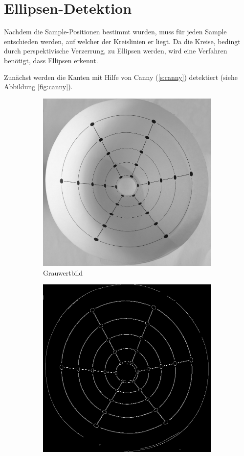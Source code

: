 \section{Ellipsen-Detektion}
\label{s:ellipseDetection}
Nachdem die Sample-Positionen bestimmt wurden, muss für jeden Sample entschieden werden, auf welcher der Kreislinien er liegt. Da die Kreise, bedingt durch perspektivische Verzerrung, zu  Ellipsen werden, wird eine Verfahren 
benötigt, dass Ellipsen erkennt. 

Zunächst werden die Kanten mit Hilfe von Canny (\ref{s:canny}) detektiert (siehe Abbildung \ref{fig:canny}). 

\begin{figure}[!htb]
	\centering
	\begin{subfigure}{.5\textwidth}
		\centering
		\includegraphics[width=.9\textwidth]{images/grey.png}
		\caption{Grauwertbild}
		\label{fig:beforeCanny}
	\end{subfigure}%
	\begin{subfigure}{.5\textwidth}
		\centering
		\includegraphics[width=.9\textwidth]{images/canny.png}

\end{subfigure}
\end{figure}

